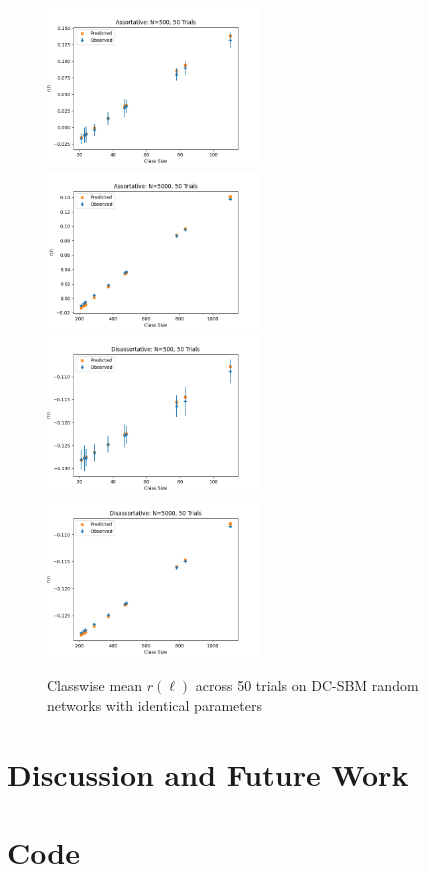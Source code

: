 \documentclass[12pt]{article}
\begin{document}
\begin{figure}[h!]
\includegraphics[width=0.5\textwidth]{assortative_N_500_trials_50.png}
\includegraphics[width=0.5\textwidth]{assortative_N_5000_trials_50.png}
\includegraphics[width=0.5\textwidth]{disassortative_N_500_trials_50.png}
\includegraphics[width=0.5\textwidth]{disassortative_N_5000_trials_50.png}
\caption{Classwise mean $r(\ell)$ across 50 trials on DC-SBM random networks with identical parameters}
\end{figure}

\section{Discussion and Future Work}


\section*{Code}
\end{document}
